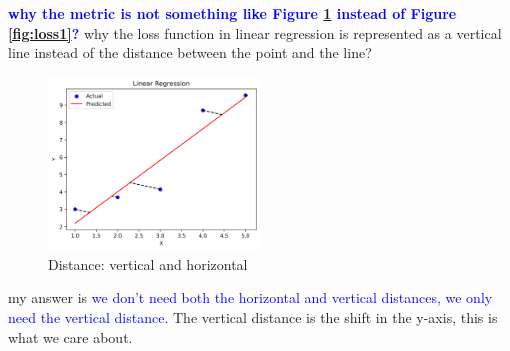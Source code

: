 \documentclass[oneside]{book}
\begin{document}
\textcolor{blue}{\textbf{why the metric is not something like Figure \ref*{fig:loss2} instead of Figure \ref*{fig:loss1}?}}
why the loss function in linear regression is represented as a vertical line instead of the distance between the point and the line?

\begin{figure}[H]
        \centering
        \includegraphics[width=0.5\textwidth]{images/Orthogonal lines.png}
        \caption{Distance: vertical and horizontal}
        \label{fig:loss2}
\end{figure}

my answer is \textcolor{blue}{we don't need both the horizontal and vertical distances, we only need the vertical distance.}  The vertical distance is the shift in the y-axis, this is what we care about.
\end{document}
